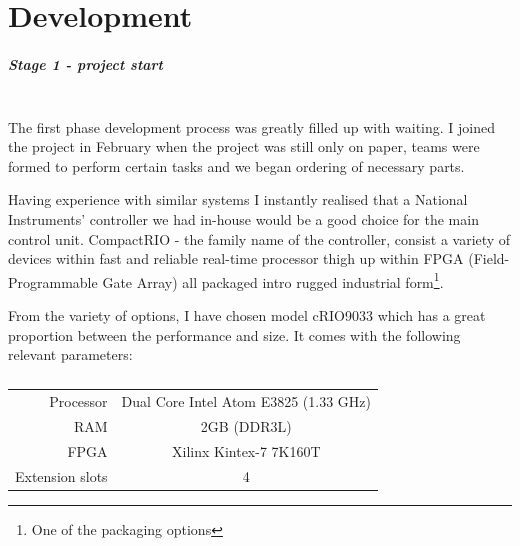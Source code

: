 \chapter{Development}
\paragraph{Stage 1 - project start}   
\addtocounter{section}{1}
\mbox{}\\
The first phase development process was greatly filled up with waiting. I joined the project in February when the project was still only on paper, teams were formed to perform certain tasks and we began ordering of necessary parts.

Having experience with similar systems I instantly realised that a National Instruments' controller we had in-house would be a good choice for the main control unit. CompactRIO - the family name of the controller, consist a variety of devices within fast and reliable real-time processor thigh up within FPGA (Field-Programmable Gate Array) all packaged intro rugged industrial form\footnote{One of the packaging options}.

From the variety of options, I have chosen model cRIO9033 which has a great proportion between the performance and size. It comes with the following relevant parameters:
\begin{table}[H]
    \centering
    \begin{tabular}{r|c}
        Processor & Dual Core Intel Atom E3825 (1.33 GHz) \\
        RAM & 2GB (DDR3L) \\
        FPGA & Xilinx Kintex-7 7K160T \\
        Extension slots & 4
    \end{tabular}
    \caption*{}
    \label{tab:cRIO_param}
    \vspace{-20pt}
\end{table}

